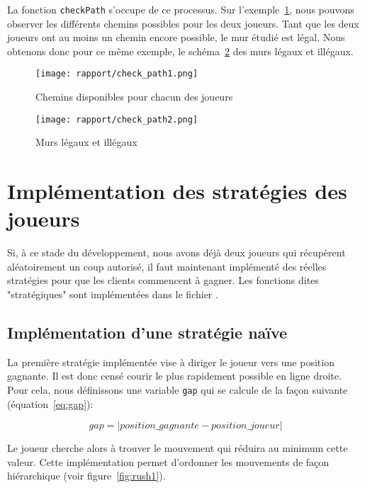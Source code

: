 \documentclass[a4paper]{article}
\begin{document}
La fonction \texttt{checkPath} s'occupe de ce processus. Sur l'exemple~\ref{fig:check_path1}, nous pouvons observer les différents chemins possibles pour les deux joueurs. Tant que les deux joueurs ont au moins un chemin encore possible, le mur étudié est légal. Nous obtenons donc pour ce même exemple, le schéma~\ref{fig:check_path2} des murs légaux et illégaux.

\begin{figure}[ht!]
    \centering
    \texttt{[image: rapport/check\_path1.png]}
    \caption{Chemins disponibles pour chacun des joueurs}
    \label{fig:check_path1}
\end{figure}

\begin{figure}[ht!]
    \centering
    \texttt{[image: rapport/check\_path2.png]}
    \caption{Murs légaux et illégaux}
    \label{fig:check_path2}
\end{figure}

\clearpage  
\section{Implémentation des stratégies des joueurs}

Si, à ce stade du développement, nous avons déjà deux joueurs qui récupèrent aléatoirement un coup autorisé, il faut maintenant implémenté des réelles stratégies pour que les clients commencent à gagner. Les fonctions dites "stratégiques" sont implémentées dans le fichier .

\subsection{Implémentation d'une stratégie naïve}

La première stratégie implémentée vise à diriger le joueur vers une position gagnante. Il est donc censé courir le plus rapidement possible en ligne droite. Pour cela, nous définissons une variable \texttt{gap} qui se calcule de la façon suivante (équation~\eqref{eq:gap}):

\begin{equation}
    gap = \lvert position\_gagnante - position\_joueur \rvert
    \label{eq:gap}
\end{equation}

Le joueur  cherche alors à trouver le mouvement qui réduira au minimum cette valeur. Cette implémentation permet d'ordonner les mouvements de façon hiérarchique (voir figure~\ref{fig:rush1}).
\end{document}
